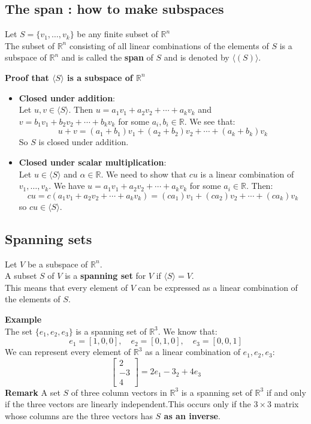 \documentclass[a4paper, 9pt]{extarticle}
\begin{document}
\subsection{The span : how to make subspaces}
\begin{definitionbox}{}{}
  Let $S = \{v_1, \dots, v_k\}$ be any finite subset of $\mathbb{R}^n$ \\[2ex]
  The subset of $\mathbb{R}^n$ consisting of all linear combinations of the elements of $S$ is a subspace of $\mathbb{R}^n$ and is called the \textbf{span} of $S$ and is denoted by $\langle (S) \rangle$.
\end{definitionbox}
\noindent \textbf{Proof that $\langle S \rangle$ is a subspace of $\mathbb{R}^n$}
\begin{itemize}
  \item  \textbf{Closed under addition}: \\
        Let $u, v \in \langle S \rangle$. Then $u = a_1v_1 + a_2v_2 + \cdots + a_kv_k$ and $v = b_1v_1 + b_2v_2 + \cdots + b_kv_k$ for some $a_i, b_i \in \mathbb{R}$. We see that:
        $$u + v = (a_1 + b_1)v_1 + (a_2 + b_2)v_2 + \cdots + (a_k + b_k)v_k$$
        So $S$ is closed under addition.
  \item \textbf{Closed under scalar multiplication}: \\
        Let $u \in \langle S \rangle$ and $\alpha \in \mathbb{R}$. We need to show that $cu$ is a linear combination of $v_1, \dots, v_k$. We have $u = a_1v_1 + a_2v_2 + \cdots + a_kv_k$ for some $a_i \in \mathbb{R}$. Then:
        $$cu = c(a_1v_1 + a_2v_2 + \cdots + a_kv_k) = (ca_1)v_1 + (ca_2)v_2 + \cdots + (ca_k)v_k$$
        so $cu \in \langle S \rangle$.
\end{itemize}

\subsection{Spanning sets}
\begin{definitionbox}{}{}
  Let $V$ be a subspace of $\mathbb{R}^n$. \\[2ex]
  A subset $S$ of $V$ is a \textbf{spanning set} for $V$ if $\langle S \rangle = V$. \\[2ex]
  This means that every element of $V$ can be expressed as a linear combination of the elements of $S$.
\end{definitionbox}
\noindent\textbf{Example} \\
The set $\{e_1, e_2, e_3\}$ is a spanning set of $\mathbb{R}^3$. We know that:
$$e_1 = [1, 0, 0], \quad e_2 = [0, 1, 0], \quad e_3 = [0, 0, 1]$$
We can represent every element of $\mathbb{R}^3$ as a linear combination of $e_1, e_2, e_3$:
$$
  \begin{bmatrix}
    2  \\
    -3 \\
    4
  \end{bmatrix}
  =
  2e_1 -3_2 + 4e_3
$$
\textbf{Remark} A set $S$ of three column vectors in $\mathbb{R}^3$ is a spanning set of $\mathbb{R}^3$ if and only if the three vectors are linearly independent.This occurs only if the $3 \times 3$ matrix whose columns are the three vectors has \textbf{$S$ as an inverse}.\\[2ex]
\end{document}
